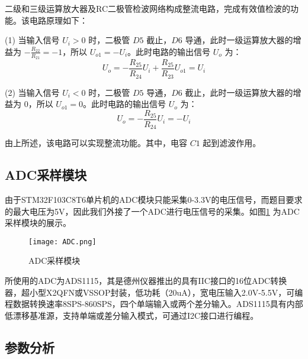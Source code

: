 \documentclass[lang=cn,11pt,a4paper]{elegantpaper}
\begin{document}
二级和三级运算放大器及RC二极管检波网络构成整流电路，完成有效值检波的功能。该电路原理如下：

(1) 当输入信号 \( U_i > 0 \) 时，二极管 \( D5 \) 截止，\( D6 \) 导通，此时一级运算放大器的增益为 \( -\frac{R_22}{R_21} = -1 \)，所以 \( U_{o1} = -U_i \)。此时电路的输出信号 \( U_o \) 为：
\[
  U_o = -\frac{R_25}{R_24} U_i + \frac{R_25}{R_23} U_{o1} = U_i
\]

(2) 当输入信号 \( U_i < 0 \) 时，二极管 \( D5 \) 导通，\( D6 \) 截止，此时一级运算放大器的增益为 0，所以 \( U_{o1} = 0 \)。此时电路的输出信号 \( U_o \) 为：
\[
  U_o = -\frac{R_25}{R_24} U_i = -U_i
\]

由上所述，该电路可以实现整流功能。其中，电容 \( C1 \) 起到滤波作用。

\subsection{ADC采样模块}
由于STM32F103C8T6单片机的ADC模块只能采集0-3.3V的电压信号，而题目要求的最大电压为5V，因此我们外接了一个ADC进行电压信号的采集。如图\ref{fig:adc_sampling} 为ADC采样模块的展示。

\begin{figure}[!htb]
  \centering
  \texttt{[image: ADC.png]}
  \caption{ADC采样模块}
  \label{fig:adc_sampling}
\end{figure}

所使用的ADC为ADS1115，其是德州仪器推出的具有IIC接口的16位ADC转换器，超小型X2QFN或VSSOP封装，低功耗（20uA），宽电压输入2.0V-5.5V，可编程数据转换速率8SPS-860SPS，四个单端输入或两个差分输入。ADS1115具有内部低漂移基准源，支持单端或差分输入模式，可通过I2C接口进行编程。

\subsection{参数分析}
\end{document}
